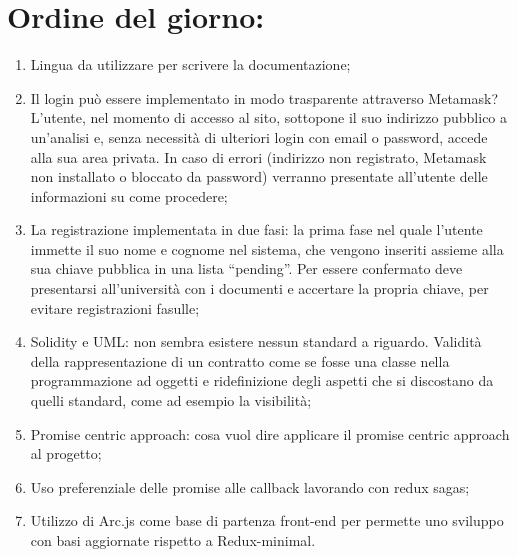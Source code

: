 \documentclass[RaccoltaVerbali.tex]{subfiles}
\begin{document}
\section{Ordine del giorno:}
\begin{enumerate}
	\item Lingua da utilizzare per scrivere la documentazione;
	\item Il login può essere implementato in modo trasparente attraverso Metamask? L’utente, nel momento di accesso al sito, sottopone il suo indirizzo pubblico a un'analisi e, senza necessità di ulteriori login con email o password, accede alla sua area privata. In caso di errori (indirizzo non registrato, Metamask non installato o bloccato da password) verranno presentate all'utente delle informazioni su come procedere;
	\item La registrazione implementata in due fasi: la prima fase nel quale l’utente immette il suo nome e cognome nel sistema, che vengono inseriti assieme alla sua chiave pubblica in una lista “pending”. Per essere confermato deve presentarsi all’università con i documenti e accertare la propria chiave, per evitare registrazioni fasulle;
	\item Solidity e UML: non sembra esistere nessun standard a riguardo. Validità della rappresentazione di un contratto come se fosse una classe nella programmazione ad oggetti e ridefinizione degli aspetti che si discostano da quelli standard, come ad esempio la visibilità;
	\item Promise centric approach: cosa vuol dire applicare il promise centric approach al progetto;
	\item Uso preferenziale delle promise alle callback lavorando con redux sagas;
	\item Utilizzo di Arc.js come base di partenza front-end per permette uno sviluppo con basi aggiornate rispetto a Redux-minimal.
\end{enumerate}
\end{document}

